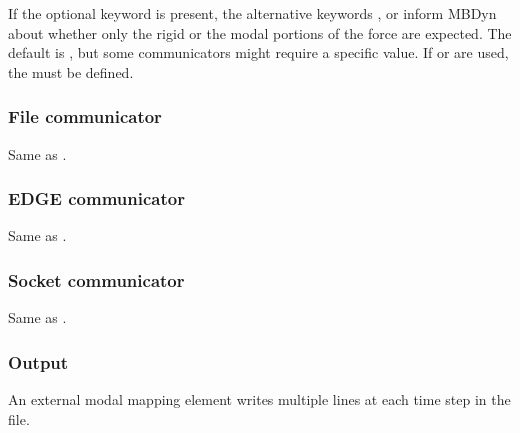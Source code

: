 If the optional keyword  is present,
the alternative keywords ,  or 
inform MBDyn about whether only the rigid or the modal portions
of the force are expected.
The default is , but some communicators might require
a specific value.
If  or  are used, the  must be defined.



\subsubsection{File communicator}
Same as .

\subsubsection{EDGE communicator}
Same as .

\subsubsection{Socket communicator}
Same as .




\subsubsection{Output}
An external modal mapping element writes multiple lines at each time step
in the  file.

